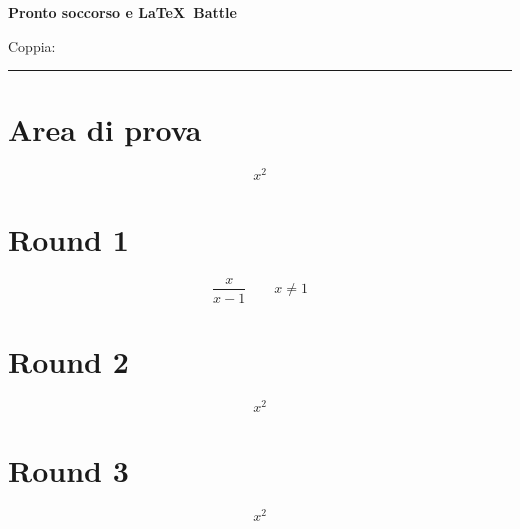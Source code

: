 \documentclass[11pt,a4paper]{article}
\begin{document}
{\Large\bfseries Pronto soccorso e \LaTeX\ Battle}\par\medskip

Coppia: \rule{8cm}{0.4pt}

\section*{Area di prova}
\[
x^2
\]

\section*{Round 1}
\[
\frac{x}{x-1} \qquad x\ne 1
\]

\section*{Round 2}
\[
x^2
\]

\section*{Round 3}
\[
x^2
\]
\end{document}
